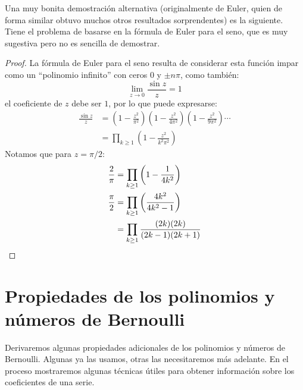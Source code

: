   Una muy bonita demostración alternativa
  (originalmente de Euler,%
   quien de forma similar
   obtuvo muchos otros resultados sorprendentes)
  es la siguiente.
  Tiene el problema de basarse en la fórmula de Euler para el seno,
  que es muy sugestiva pero no es sencilla de demostrar.
  \begin{proof}
    La fórmula de Euler para el seno
    resulta de considerar esta función impar
    como un ``polinomio infinito'' con ceros \(0\) y \(\pm n \pi\),
    como también:
    \begin{equation*}
      \lim_{z \rightarrow 0} \frac{\sin z}{z}
	= 1
    \end{equation*}
    el coeficiente de \(z\) debe ser \(1\),
    por lo que puede expresarse:%
    \begin{align*}
      \frac{\sin z}{z}
	&= \left( 1 - \frac{z^2}{\pi^2} \right)
	     \left( 1 - \frac{z^2}{4 \pi^2} \right)
	     \left( 1 - \frac{z^2}{9 \pi^2} \right) \dotsm \\
	&= \prod_{k \ge 1}
	     \left( 1 - \frac{z^2}{k^2 \pi^2} \right)
    \end{align*}
    Notamos que para \(z = \pi / 2\):
    \begin{align*}
      \frac{2}{\pi}
	&= \prod_{k \ge 1} \left( 1 - \frac{1}{4 k^2} \right) \\
      \frac{\pi}{2}
	&= \prod_{k \ge 1} \left( \frac{4 k^2}{4 k^2 - 1} \right) \\
	&= \prod_{k \ge 1} \frac{(2 k) (2 k)}{(2 k - 1) (2 k + 1)}
      \qedhere
    \end{align*}
  \end{proof}

\section{Propiedades de los polinomios
       y números de Bernoulli}
\label{sec:propiedades-Bernoulli}

  Derivaremos algunas propiedades adicionales
  de los polinomios y números de Bernoulli.%
  Algunas ya las usamos,
  otras las necesitaremos más adelante.
  En el proceso mostraremos algunas técnicas útiles
  para obtener información sobre los coeficientes de una serie.%

